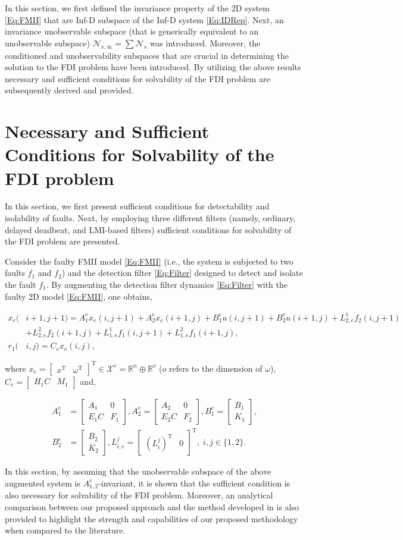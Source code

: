 \documentclass[journal,12pt,draftcls,onecolumn]{IEEEtran}
\newcommand{\tran}{\mathrm{T}}
\newcommand{\bbm}{\begin{bmatrix}}
\newcommand{\ebm}{\end{bmatrix}}
\newcommand{\bs}{\begin{small}}
\newcommand{\es}{\end{small}}
\newcommand{\ssp}[1]{\mathscr{#1}}      \newcommand{\setssp}[1]{\mathfrak{#1}}   \newcommand{\fld}[1]{\mathbb{#1}}       \newcommand{\op}[1]{\mathcal{#1}}       \newcommand{\sumbanach}[1]{\sum{#1}}
\newcommand{\infd}{Inf-D }
\begin{document}
In this section, we first defined the invariance property of the 2D system \eqref{Eq:FMII} that are Inf-D subspace of the \infd system \eqref{Eq:IDRep}. Next, an invariance unobservable subspace (that is generically equivalent to an unobservable subspace) $\ssp{N}_{s,\infty}=\sum\ssp{N}_s$ was introduced. Moreover, the conditioned and unobservability subspaces that are crucial in determining the solution to the FDI problem have been introduced. By utilizing the above results necessary and sufficient conditions for solvability of the FDI problem are subsequently derived and provided.

\section{Necessary and Sufficient Conditions for Solvability of the FDI problem}\label{Sec:FDI}
In this section, we first present  sufficient conditions for detectability and isolability of faults. Next, by employing three different filters (namely, ordinary, delayed deadbeat, and LMI-based filters) sufficient conditions for solvability of the FDI problem are presented.

Consider the faulty FMII model \eqref{Eq:FMII} (i.e., the system is subjected to two faults $f_1$ and $f_2$) and the detection filter \eqref{Eq:Filter} designed to detect and isolate the fault $f_1$. By augmenting the detection filter dynamics \eqref{Eq:Filter} with the faulty 2D model \eqref{Eq:FMII}, one obtains,
\bs
\begin{equation}\label{Eq:AugSys}
	\begin{split}
		x_e(&i+1,j+1) = A_1^ex_e(i,j+1) + A_2^ex_e(i+1,j) + B_1^e u(i,j+1)+ B_2^e u(i+1,j)+ L_{2,e}^1f_2(i,j+1) \\&+ L_{2,e}^2f_2(i+1,j)+L_{1,e}^1f_1(i,j+1)+L_{1,e}^2f_1(i+1,j),\\
		r_1(&i,j) =  C_ex_e(i,j),
	\end{split}
\end{equation}
\es
where $x_e = \bbm x^\tran &\omega^\tran\ebm^\tran\in \ssp{X}^e = \fld{R}^n\oplus\fld{R}^o$ ($o$ refers to the dimension of $\omega$), $C_e = \bbm H_1C &M_1\ebm$ and,
\bs
\begin{equation}\label{Eq:AugSysPar}
	\begin{split}
		A_1^e &= \bbm A_1 &0\\E_1C &F_1\ebm, A_2^e = \bbm A_2 &0\\ E_2C &F_2\ebm, B_1^e = \bbm B_1 \\K_1\ebm ,\\
		B_2^e &= \bbm B_2 \\ K_2 \ebm , L_{i,e}^j = \bbm (L_i^j)^\tran &0\ebm^\tran, \; i,j\in\{1,2\}.
	\end{split}
\end{equation}
\es
In this section, by assuming that the unobservable subspace of the above augmented system is $A^e_{1,2}$-invariant, it is shown that the sufficient condition is also necessary for solvability of the FDI problem. Moreover, an analytical  comparison between our proposed approach and the method developed in \cite{Malek_3DFDI} is also provided to highlight the strength and capabilities of our proposed methodology when compared to the literature.
\end{document}
